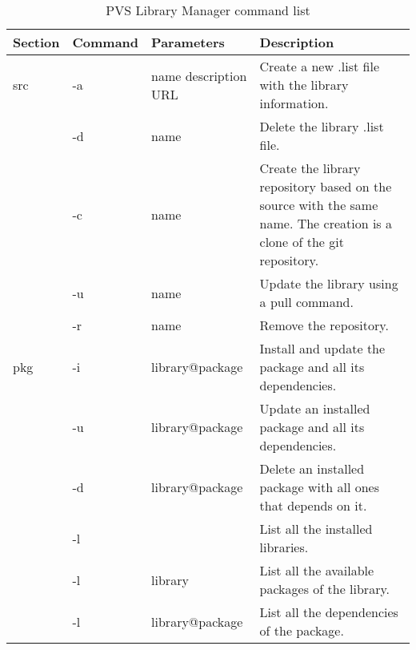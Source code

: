 \begin{table}[h!]
  \begin{center}
    \begin{tabular}{ | l | l | l | p{5cm} | }
      \hline Section & Command & Parameters & Description \\ \hline
      src & -a          & name description URL  & Create a new .list file with the library information.                   \\ \cline{2-4}
          & -d          & name                  & Delete the library .list file.                                          \\ \cline{2-4}
          & -c          & name                  & Create the library repository based on the source with the same name. 
                                                  The creation is a clone of the git repository.                          \\ \cline{2-4}
          & -u          & name                  & Update the library using a pull command.                                \\ \cline{2-4}
          & -r          & name                  & Remove the repository.                                                  \\ \hline
      pkg & -i          & library@package       & Install and update the package and all its dependencies.                \\ \cline{2-4}
          & -u          & library@package       & Update an installed package and all its dependencies.                   \\ \cline{2-4}
          & -d          & library@package       & Delete an installed package with all ones that depends on it.           \\ \cline{2-4}
          & -l          &                       & List all the installed libraries.                                       \\ \cline{2-4}
          & -l          & library               & List all the available packages of the library.                         \\ \cline{2-4}
          & -l          & library@package       & List all the dependencies of the package.                               \\ \hline
    \end{tabular}
  \end{center}
  \caption{PVS Library Manager command list}
  \label{tab:comm}
\end{table}

